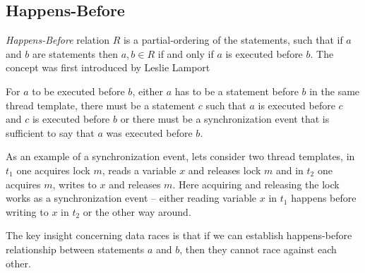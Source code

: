\documentclass[..thesis.tex]{subfiles}
\begin{document}
\subsection{Happens-Before}

\textit{Happens-Before} relation $R$ is a partial-ordering of the statements, such that if $a$ and $b$ are statements then  $a,b \in R$ if and only if $a$ is executed before $b$. The concept was first introduced by Leslie Lamport \cite{lamport_time_1978}

For $a$ to be executed before $b$, either $a$ has to be a statement before $b$ in the same thread template, there must be a statement $c$ such that $a$ is executed before $c$ and $c$ is executed before $b$ or there must be a synchronization event that is sufficient to say that $a$ was executed before $b$.

As an example of a synchronization event, lets consider two thread templates, in $t_1$ one acquires lock $m$, reads a variable $x$ and releases lock $m$ and in $t_2$ one acquires $m$, writes to $x$ and releases $m$. Here acquiring and releasing the lock works as a synchronization event -- either reading variable $x$ in $t_1$ happens before writing to $x$ in $t_2$ or the other way around.

The key insight concerning data races is that if we can establish happens-before relationship between statements $a$ and $b$, then they cannot race against each other. 
\end{document}
